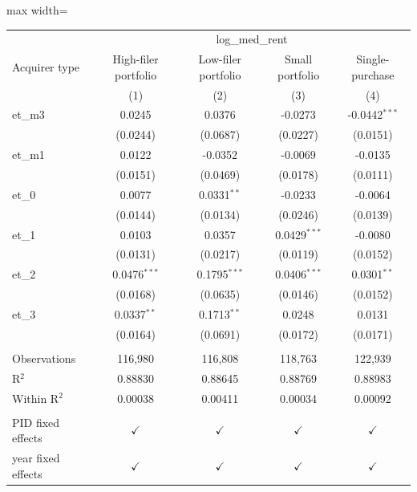 \documentclass[
  11pt,
]{article}
\begin{document}
\scriptsize
\begin{adjustbox}{max width=\textwidth}

\begingroup
\centering
\begin{tabular}{lcccc}
   \toprule
    & \multicolumn{4}{c}{log\_med\_rent}\\
   Acquirer type      & High-filer portfolio & Low-filer portfolio & Small portfolio & Single-purchase \\   
                      & (1)                  & (2)                 & (3)             & (4)\\  
   \midrule 
   et\_m3             & 0.0245               & 0.0376              & -0.0273         & -0.0442$^{***}$\\   
                      & (0.0244)             & (0.0687)            & (0.0227)        & (0.0151)\\   
   et\_m1             & 0.0122               & -0.0352             & -0.0069         & -0.0135\\   
                      & (0.0151)             & (0.0469)            & (0.0178)        & (0.0111)\\   
   et\_0              & 0.0077               & 0.0331$^{**}$       & -0.0233         & -0.0064\\   
                      & (0.0144)             & (0.0134)            & (0.0246)        & (0.0139)\\   
   et\_1              & 0.0103               & 0.0357              & 0.0429$^{***}$  & -0.0080\\   
                      & (0.0131)             & (0.0217)            & (0.0119)        & (0.0152)\\   
   et\_2              & 0.0476$^{***}$       & 0.1795$^{***}$      & 0.0406$^{***}$  & 0.0301$^{**}$\\   
                      & (0.0168)             & (0.0635)            & (0.0146)        & (0.0152)\\   
   et\_3              & 0.0337$^{**}$        & 0.1713$^{**}$       & 0.0248          & 0.0131\\   
                      & (0.0164)             & (0.0691)            & (0.0172)        & (0.0171)\\   
    \\
   Observations       & 116,980              & 116,808             & 118,763         & 122,939\\  
   R$^2$              & 0.88830              & 0.88645             & 0.88769         & 0.88983\\  
   Within R$^2$       & 0.00038              & 0.00411             & 0.00034         & 0.00092\\  
    \\
   PID fixed effects  & $\checkmark$         & $\checkmark$        & $\checkmark$    & $\checkmark$\\   
   year fixed effects & $\checkmark$         & $\checkmark$        & $\checkmark$    & $\checkmark$\\   
   \bottomrule
\end{tabular}
\par\endgroup




\end{adjustbox}
\end{document}
